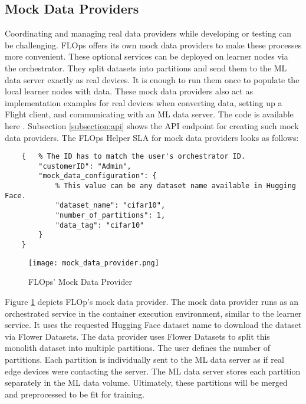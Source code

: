 \subsection{Mock Data Providers}

Coordinating and managing real data providers while developing or testing can be challenging.
FLOps offers its own mock data providers to make these processes more convenient.
These optional services can be deployed on learner nodes via the orchestrator.
They split datasets into partitions and send them to the ML data server exactly as real devices.
It is enough to run them once to populate the local learner nodes with data.
These mock data providers also act as implementation examples for real devices when converting data, setting up a Flight client, and communicating with an ML data server.
The code is available here \cite{flops_code}.
Subsection \ref{subsection:api} shows the API endpoint for creating such mock data providers.
The FLOps Helper SLA for mock data providers looks as follows:
\begin{lstlisting}
    {   % The ID has to match the user's orchestrator ID.
        "customerID": "Admin",
        "mock_data_configuration": {
            % This value can be any dataset name available in Hugging Face.
            "dataset_name": "cifar10",
            "number_of_partitions": 1,
            "data_tag": "cifar10" 
        }
    }
\end{lstlisting}
\begin{figure}[h]
    \begin{adjustwidth}{-0.1\paperwidth}{-0.1\paperwidth}
        \centering
        \texttt{[image: mock\_data\_provider.png]}
        \caption{FLOps' Mock Data Provider}
        \label{fig:mock_data_provider}
    \end{adjustwidth}
\end{figure}
Figure \ref{fig:mock_data_provider} depicts FLOp's mock data provider.
The mock data provider runs as an orchestrated service in the container execution environment, similar to the learner service.
It uses the requested Hugging Face dataset name to download the dataset via Flower Datasets.
The data provider uses Flower Datasets to split this monolith dataset into multiple partitions.
The user defines the number of partitions.
Each partition is individually sent to the ML data server as if real edge devices were contacting the server.
The ML data server stores each partition separately in the ML data volume.
Ultimately, these partitions will be merged and preprocessed to be fit for training.
